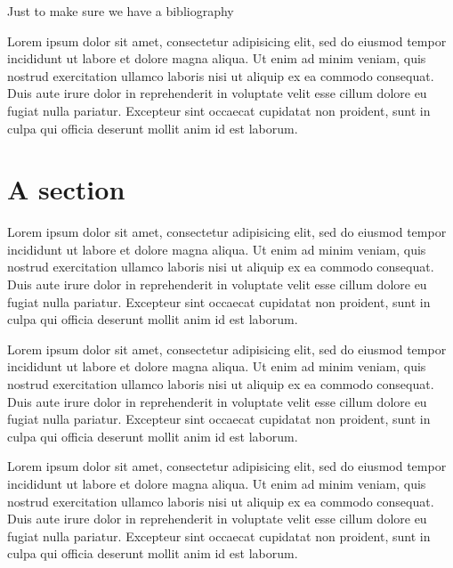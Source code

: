 \documentclass[a4paper,12pt,titlepage,openright]{report}
\begin{document}
 

 

\onehalfspacing 


Just to make sure we have a bibliography \cite{LaValle06}

Lorem ipsum dolor sit amet, consectetur adipisicing elit, sed do eiusmod tempor
incididunt ut labore et dolore magna aliqua. Ut enim ad minim veniam, quis
nostrud exercitation ullamco laboris nisi ut aliquip ex ea commodo consequat.
Duis aute irure dolor in reprehenderit in voluptate velit esse cillum dolore eu
fugiat nulla pariatur. Excepteur sint occaecat cupidatat non proident, sunt in
culpa qui officia deserunt mollit anim id est laborum.

\section{A section}

Lorem ipsum dolor sit amet, consectetur adipisicing elit, sed do eiusmod tempor
incididunt ut labore et dolore magna aliqua. Ut enim ad minim veniam, quis
nostrud exercitation ullamco laboris nisi ut aliquip ex ea commodo consequat.
Duis aute irure dolor in reprehenderit in voluptate velit esse cillum dolore eu
fugiat nulla pariatur. Excepteur sint occaecat cupidatat non proident, sunt in
culpa qui officia deserunt mollit anim id est laborum.




Lorem ipsum dolor sit amet, consectetur adipisicing elit, sed do eiusmod tempor
incididunt ut labore et dolore magna aliqua. Ut enim ad minim veniam, quis
nostrud exercitation ullamco laboris nisi ut aliquip ex ea commodo consequat.
Duis aute irure dolor in reprehenderit in voluptate velit esse cillum dolore eu
fugiat nulla pariatur. Excepteur sint occaecat cupidatat non proident, sunt in
culpa qui officia deserunt mollit anim id est laborum.




Lorem ipsum dolor sit amet, consectetur adipisicing elit, sed do eiusmod tempor
incididunt ut labore et dolore magna aliqua. Ut enim ad minim veniam, quis
nostrud exercitation ullamco laboris nisi ut aliquip ex ea commodo consequat.
Duis aute irure dolor in reprehenderit in voluptate velit esse cillum dolore eu
fugiat nulla pariatur. Excepteur sint occaecat cupidatat non proident, sunt in
culpa qui officia deserunt mollit anim id est laborum.
\end{document}
